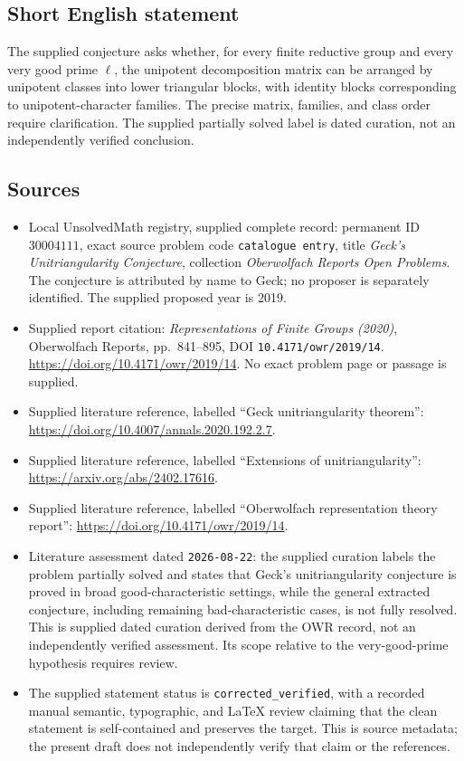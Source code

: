 \documentclass[11pt]{article}
\begin{document}
\subsection{Short English statement}
The supplied conjecture asks whether, for every finite reductive group and every very good prime \(\ell\), the unipotent decomposition matrix can be arranged by unipotent classes into lower triangular blocks, with identity blocks corresponding to unipotent-character families. The precise matrix, families, and class order require clarification. The supplied partially solved label is dated curation, not an independently verified conclusion.
\subsection{Sources}
\begin{itemize}
\item Local UnsolvedMath registry, supplied complete record: permanent ID \(30004111\), exact source problem code \texttt{catalogue entry}, title \emph{Geck's Unitriangularity Conjecture}, collection \emph{Oberwolfach Reports Open Problems}. The conjecture is attributed by name to Geck; no proposer is separately identified. The supplied proposed year is 2019.
\item Supplied report citation: \emph{Representations of Finite Groups (2020)}, Oberwolfach Reports, pp.~841--895, DOI \texttt{10.4171/owr/2019/14}. \url{https://doi.org/10.4171/owr/2019/14}. No exact problem page or passage is supplied.
\item Supplied literature reference, labelled ``Geck unitriangularity theorem'': \url{https://doi.org/10.4007/annals.2020.192.2.7}.
\item Supplied literature reference, labelled ``Extensions of unitriangularity'': \url{https://arxiv.org/abs/2402.17616}.
\item Supplied literature reference, labelled ``Oberwolfach representation theory report'': \url{https://doi.org/10.4171/owr/2019/14}.
\item Literature assessment dated \texttt{2026-08-22}: the supplied curation labels the problem partially solved and states that Geck's unitriangularity conjecture is proved in broad good-characteristic settings, while the general extracted conjecture, including remaining bad-characteristic cases, is not fully resolved. This is supplied dated curation derived from the OWR record, not an independently verified assessment. Its scope relative to the very-good-prime hypothesis requires review.
\item The supplied statement status is \texttt{corrected\_verified}, with a recorded manual semantic, typographic, and LaTeX review claiming that the clean statement is self-contained and preserves the target. This is source metadata; the present draft does not independently verify that claim or the references.
\end{itemize}
\end{document}
